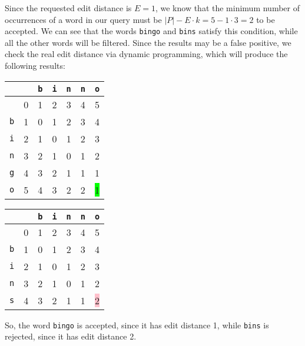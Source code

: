 %
Since the requested edit distance is $E = 1$, we know that the minimum number of
occurrences of a word in our query must be $|P| - E \cdot k = 5 - 1 \cdot 3 = 2$
to be accepted. We can see that the words \texttt{bingo} and \texttt{bins}
satisfy this condition, while all the other words will be filtered. Since the
results may be a false positive, we check the real edit distance via dynamic
programming, which will produce the following results:
%
\begin{table}[H]
  \centering
  \begin{tabular}{c|c|c|c|c|c|c|}
            &   & {\tt b} & {\tt i} & {\tt n} & {\tt n} & {\tt o} \\ \hline
            & 0 &    1    &    2    &    3    &    4    &    5 \\ \hline
    {\tt b} & 1 &    0    &    1    &    2    &    3    &    4 \\ \hline
    {\tt i} & 2 &    1    &    0    &    1    &    2    &    3 \\ \hline
    {\tt n} & 3 &    2    &    1    &    0    &    1    &    2 \\ \hline
    {\tt g} & 4 &    3    &    2    &    1    &    1    &    1 \\ \hline
    {\tt o} & 5 &    4    &    3    &    2    &    2    & \colorbox{lime}{1} \\
    \hline
  \end{tabular}
  \quad\quad
  \begin{tabular}{c|c|c|c|c|c|c|}
            &   & {\tt b} & {\tt i} & {\tt n} & {\tt n} & {\tt o} \\ \hline
            & 0 &    1    &    2    &    3    &    4    &    5 \\ \hline
    {\tt b} & 1 &    0    &    1    &    2    &    3    &    4 \\ \hline
    {\tt i} & 2 &    1    &    0    &    1    &    2    &    3 \\ \hline
    {\tt n} & 3 &    2    &    1    &    0    &    1    &    2 \\ \hline
    {\tt s} & 4 &    3    &    2    &    1    &    1    & \colorbox{pink}{2} \\
    \hline
  \end{tabular}
\end{table}
%
So, the word \texttt{bingo} is accepted, since it has edit distance 1, while
\texttt{bins} is rejected, since it has edit distance 2.
